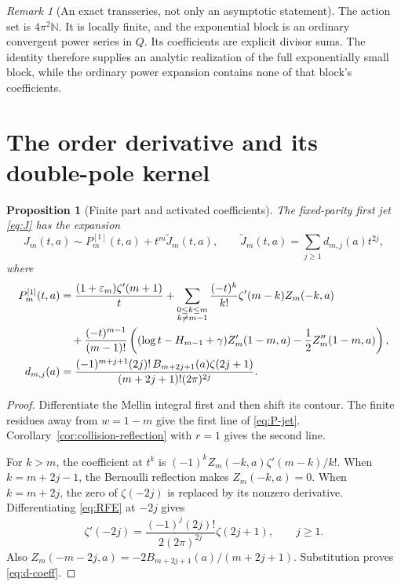 \documentclass[11pt,a4paper]{article}
\numberwithin{equation}{section}
\newtheorem{proposition}[theorem]{Proposition}
\theoremstyle{definition}\newtheorem{definition}[theorem]{Definition}
\theoremstyle{remark}\newtheorem{remark}[theorem]{Remark}
\newcommand{\N}{\mathbb N}\newcommand{\Z}{\mathbb Z}
\newcommand{\eps}{\varepsilon}\newcommand{\muh}{\widehat\mu}
\begin{document}
\begin{remark}[An exact transseries, not only an asymptotic statement]
The action set is $4\pi^2\N$. It is locally finite, and the exponential
block is an ordinary convergent power series in $Q$. Its coefficients
are explicit divisor sums. The identity therefore supplies an analytic
realization of the full exponentially small block, while the ordinary
power expansion contains none of that block's coefficients.
\end{remark}

\section{The order derivative and its double-pole kernel}
\label{sec:jet-borel}

\begin{proposition}[Finite part and activated coefficients]
\label{prop:jet-tail}
The fixed-parity first jet \eqref{eq:J} has the expansion
\begin{equation}
 J_m(t,a)\sim P_m^{[1]}(t,a)+t^m\widetilde J_m(t,a),
 \qquad\widetilde J_m(t,a)=\sum_{j\ge1}d_{m,j}(a)t^{2j},
 \label{eq:jet-expansion}
\end{equation}
where
\begin{align}
 P_m^{[1]}(t,a)&=\frac{(1+\eps_m)\zeta'(m+1)}t+
 \sum_{\substack{0\le k\le m\\k\ne m-1}}
       \frac{(-t)^k}{k!}\zeta'(m-k)Z_m(-k,a)\notag\\
 &\quad+\frac{(-t)^{m-1}}{(m-1)!}
 \left((\log t-H_{m-1}+\gamma)Z_m'(1-m,a)
                          -\frac12Z_m''(1-m,a)\right),
       \label{eq:P-jet}\\
 d_{m,j}(a)&=\frac{(-1)^{m+j+1}(2j)!\,B_{m+2j+1}(a)\zeta(2j+1)}
                        {(m+2j+1)!(2\pi)^{2j}}.
       \label{eq:d-coeff}
\end{align}
\end{proposition}
\begin{proof}
Differentiate the Mellin integral first and then shift its contour.
The finite residues away from $w=1-m$ give the first line of
\eqref{eq:P-jet}. Corollary~\ref{cor:collision-reflection} with $r=1$
gives the second line.

For $k>m$, the coefficient at $t^k$ is
$(-1)^kZ_m(-k,a)\zeta'(m-k)/k!$.
When $k=m+2j-1$, the Bernoulli reflection makes $Z_m(-k,a)=0$.
When $k=m+2j$, the zero of $\zeta(-2j)$ is replaced by its nonzero
derivative. Differentiating \eqref{eq:RFE} at $-2j$ gives
\begin{equation}
 \zeta'(-2j)=\frac{(-1)^j(2j)!}{2(2\pi)^{2j}}\zeta(2j+1),
 \qquad j\ge1.
 \label{eq:trivial-zero-derivative}
\end{equation}
Also $Z_m(-m-2j,a)=-2B_{m+2j+1}(a)/(m+2j+1)$.
Substitution proves \eqref{eq:d-coeff}.
\end{proof}
\end{document}
